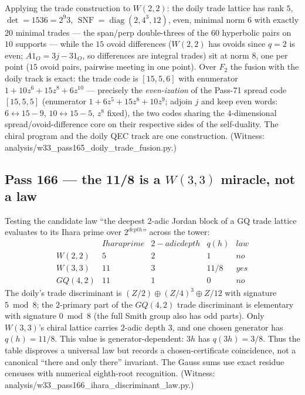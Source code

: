 \documentclass[12pt,a4paper]{article}
\def\mathbb#1{#1}%
\def\mathrm#1{#1}%
\def\mathbf#1{#1}%
\def\textbf#1{#1}%
\def\texttt#1{#1}%
\def\text#1{#1}%
\def\cdot{ }%
\theoremstyle{definition}
\newcommand{\GQ}{\mathrm{GQ}}
\begin{document}
Applying the trade construction to $W(2,2)$: the doily trade lattice has
rank $5$, $\det=1536=2^9\cdot3$,
$\operatorname{SNF}=\operatorname{diag}(2,4^3,12)$, even, minimal norm $6$
with exactly $20$ minimal trades --- the span/perp double-threes of the
$60$ hyperbolic pairs on $10$ supports --- while the $15$ ovoid differences
($W(2,2)$ has ovoids since $q=2$ is even; $A\mathbf 1_O=3\mathbf
j-3\mathbf 1_O$, so differences are integral trades) sit at norm $8$, one
per point ($15$ ovoid pairs, pairwise meeting in one point). Over
$\mathbb F_2$ the fusion with the doily track is exact: the trade code is
$[15,5,6]$ with enumerator $1+10z^6+15z^8+6z^{10}$ --- precisely the
\emph{even-ization} of the Pass-71 spread code $[15,5,5]$ (enumerator
$1+6z^5+15z^8+10z^9$; adjoin $\mathbf j$ and keep even words:
$6\!\leftrightarrow\!15-9$, $10\!\leftrightarrow\!15-5$, $z^8$ fixed), the
two codes sharing the $4$-dimensional spread/ovoid-difference core on
their respective sides of the self-duality. The chiral program and the
doily QEC track are one construction. (Witness:
\texttt{analysis/w33\_pass165\_doily\_trade\_fusion.py}.)

\subsection{Pass 166 --- the 11/8 is a $W(3,3)$ miracle, not a law}
\label{ssec:pass166}

Testing the candidate law ``the deepest 2-adic Jordan block of a GQ trade
lattice evaluates to its Ihara prime over $2^{\mathrm{depth}}$'' across the
tower:
\[
\begin{array}{l|c|c|c|c}
 & \text{Ihara prime} & \text{2-adic depth} & q(h) & \text{law} \\\hline
W(2,2) & 5 & 2 & 1 & \text{no}\\
W(3,3) & 11 & 3 & 11/8 & \textbf{yes}\\
\GQ(4,2) & 11 & 1 & 0 & \text{no}
\end{array}
\]
The doily's trade discriminant is $(\mathbb Z/2)\oplus(\mathbb
Z/4)^3\oplus\mathbb Z/12$ with signature $5\bmod8$; the $2$-primary part
of the $\GQ(4,2)$ trade discriminant is elementary with signature
$0\bmod8$ (the full Smith group also has odd parts).  Only $W(3,3)$'s
chiral lattice carries $2$-adic depth $3$, and one chosen generator has
$q(h)=11/8$.  This value is generator-dependent: $3h$ has $q(3h)=3/8$.
Thus the table disproves a universal law but records a chosen-certificate
coincidence, not a canonical ``there and only there'' invariant.  The
Gauss sums use exact residue censuses with numerical eighth-root
recognition.
(Witness: \texttt{analysis/w33\_pass166\_ihara\_discriminant\_law.py}.)
\end{document}
